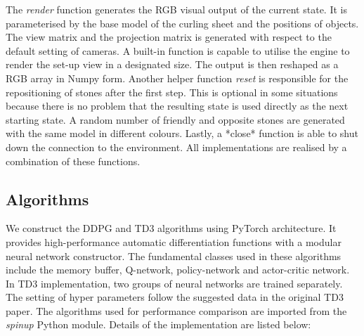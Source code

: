 \documentclass[oneside,11pt,a4paper]{article}
\begin{document}
\newline
\newline
\noindent
The \textit{render} function generates the RGB visual output of the current state. It is parameterised by the base model of the curling sheet and the positions of objects. The view matrix and the projection matrix is generated with respect to the default setting of cameras. A built-in function is capable to utilise the engine to render the set-up view in a designated size. The output is then reshaped as a RGB array in Numpy form.
\newline
\newline
\noindent
Another helper function \textit{reset} is responsible for the repositioning of stones after the first step. This is optional in some situations because there is no problem that the resulting state is used directly as the next starting state. A random number of friendly and opposite stones are generated with the same model in different colours. Lastly, a *close* function is able to shut down the connection to the environment. All implementations are realised by a combination of these functions.
\newline
\newline
\noindent
\subsection{Algorithms}
We construct the DDPG and TD3 algorithms using PyTorch architecture. It provides high-performance automatic differentiation functions with a modular neural network constructor. The fundamental classes used in these algorithms include the memory buffer, Q-network, policy-network and actor-critic network. In TD3 implementation, two groups of neural networks are trained separately. The setting of hyper parameters follow the suggested data in the original TD3 paper. The algorithms used for performance comparison are imported from the \textit{spinup }Python module. Details of the implementation are listed below:
\end{document}

